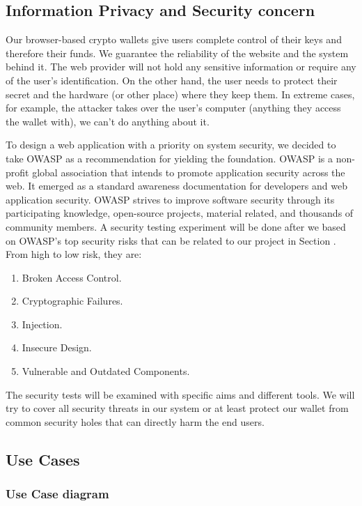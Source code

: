 \subsection{Information Privacy and Security concern}

Our browser-based crypto wallets give users complete control of their keys and therefore their funds. We guarantee the reliability of the website and the system behind it. The web provider will not hold any sensitive information or require any of the user's identification. On the other hand, the user needs to protect their secret and the hardware (or other place) where they keep them. In extreme cases, for example, the attacker takes over the user's computer (anything they access the wallet with), we can't do anything about it.

To design a web application with a priority on system security, we decided to take OWASP as a recommendation for yielding the foundation. OWASP is a non-profit global association that intends to promote application security across the web. It emerged as a standard awareness documentation for developers and web application security. OWASP strives to improve software security through its participating knowledge, open-source projects, material related, and thousands of community members. A security testing experiment will be done after we based on OWASP's top security risks that can be related to our project in Section . From high to low risk, they are:

\begin{enumerate}
    \item Broken Access Control.
    \item Cryptographic Failures.
    \item Injection.
    \item Insecure Design.
    \item Vulnerable and Outdated Components.
\end{enumerate}

The security tests will be examined with specific aims and different tools. We will try to cover all security threats in our system or at least protect our wallet from common security holes that can directly harm the end users.


\subsection{Use Cases}

\subsubsection{Use Case diagram}

